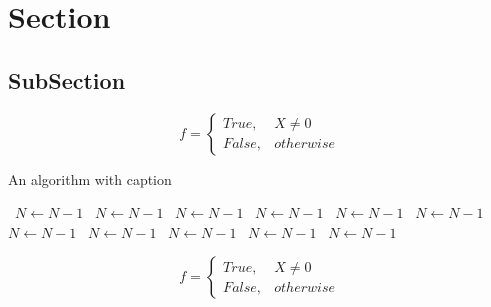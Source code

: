 \documentclass[a4paper]{article}
\begin{document}
\section{Section}

\subsection{SubSection}

\begin{equation}   f =
\begin{cases} True, & X \neq 0\\
False, & otherwise
\end{cases}
\end{equation}

\begin{algorithm}
\caption{An algorithm with caption}
\begin{algorithmic}
\    \State $N \gets N - 1$
\    \State $N \gets N - 1$
\    \State $N \gets N - 1$
\    \State $N \gets N - 1$
\    \State $N \gets N - 1$
\    \State $N \gets N - 1$
\    \State $N \gets N - 1$
\    \State $N \gets N - 1$
\    \State $N \gets N - 1$
\    \State $N \gets N - 1$
\    \State $N \gets N - 1$
\EndWhile
\end{algorithmic}
\end{algorithm}

\begin{equation}   f =
\begin{cases} True, & X \neq 0\\
False, & otherwise
\end{cases}
\end{equation}
\end{document}
